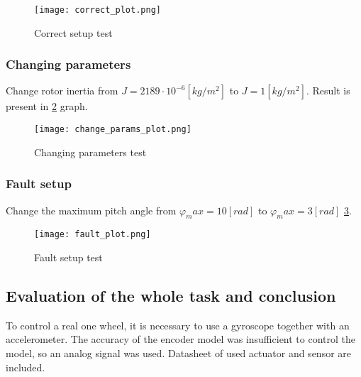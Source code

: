 \documentclass[../report.tex]{subfiles}
\begin{document}
\begin{figure}[htb!]
    \centering
    \texttt{[image: correct\_plot.png]}
\caption{Correct setup test}
    \label{fig:correct}
\end{figure}
\subsubsection{Changing parameters}
Change rotor inertia from $J = 2189\cdot10^{-6} [kg/m^2]$ to $J = 1
[kg/m^2]$. Result is present in \ref{fig:change} graph.
\begin{figure}[htb!]
    \centering
    \texttt{[image: change\_params\_plot.png]}
\caption{Changing parameters test}
    \label{fig:change}
\end{figure}
\subsubsection{Fault setup}
Change the maximum pitch angle from $\varphi_max = 10 [rad]$ to $\varphi_max = 3
[rad]$ \ref{fig:fault}.
\begin{figure}[htb!]
    \centering
    \texttt{[image: fault\_plot.png]}
\caption{Fault setup test}
    \label{fig:fault}
\end{figure}
\subsection{Evaluation of the whole task and conclusion}
To control a real one wheel, it is necessary to use a gyroscope together
with an accelerometer.
The accuracy of the encoder model was insufficient to control the model, so
an analog signal was used.
Datasheet of used actuator and sensor are included.
\end{document}
